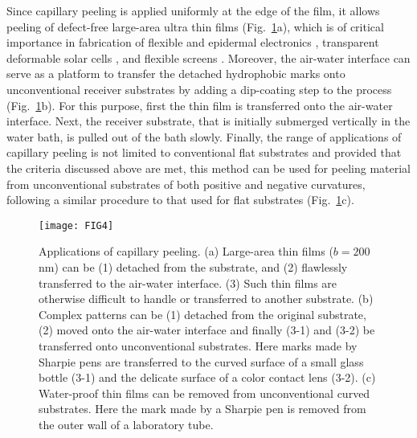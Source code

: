 \documentclass[10pt,twocolumn]{article}
\begin{document}
Since capillary peeling is applied uniformly at the edge of the film, it allows peeling of defect-free large-area ultra thin films (Fig.~\ref{fig:application}a), which is of critical importance in fabrication of flexible and epidermal electronics \cite{Cao:2008,Eda:2008,Kim:2011b,Lee:2011,Kaltenbrunner:2013}, transparent deformable solar cells \cite{Kim:2015,Baca:2010}, and flexible screens \cite{Choi:2008,Kim:2011a}.
Moreover, the air-water interface can serve as a platform to transfer the detached hydrophobic marks onto unconventional receiver substrates by adding a dip-coating step to the process \cite{Scriven:1988} (Fig.~\ref{fig:application}b).
For this purpose, first the thin film is transferred onto the air-water interface. Next, the receiver substrate, that is initially submerged vertically in the water bath, is pulled out of the bath slowly.
Finally, the range of applications of capillary peeling is not limited to conventional flat substrates and provided that the criteria discussed above are met, this method can be used for peeling material from unconventional substrates of both positive and negative curvatures, following a similar procedure to that used for flat substrates (Fig.~\ref{fig:application}c).
 \begin{figure}[ht!]
     \texttt{[image: FIG4]}%
     \caption{Applications of capillary peeling.
     (a) Large-area thin films ($b = 200$ nm) can be (1) detached from the substrate, and (2) flawlessly transferred to the air-water interface.
     (3) Such thin films are otherwise difficult to handle or transferred to another substrate.
     (b) Complex patterns can be (1) detached from the original substrate, (2) moved onto the air-water interface and finally (3-1) and (3-2) be transferred onto unconventional substrates.
     Here marks made by Sharpie\textsuperscript{\textregistered} pens are transferred to the curved surface of a small glass bottle (3-1) and the delicate surface of a color contact lens (3-2).
     (c) Water-proof thin films can be removed from unconventional curved substrates.
     Here the mark made by a Sharpie\textsuperscript{\textregistered} pen is removed from the outer wall of a laboratory tube.\label{fig:application}}
 \end{figure}
\end{document}
